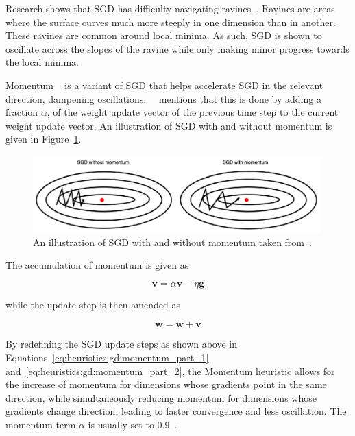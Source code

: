 Research shows that \acs{SGD} has difficulty navigating ravines~\cite{ref:sutton:1986}. Ravines are areas where the surface curves much more steeply in one dimension than in another. These ravines are common around local minima. As such, \acs{SGD} is shown to oscillate across the slopes of the ravine while only making minor progress towards the local minima.

\Acs{Momentum} ~\cite{ref:qian:1999} is a variant of \acs{SGD} that helps accelerate \acs{SGD} in the relevant direction, dampening oscillations.~\citeauthor{ref:ruder:2016}~\cite{ref:ruder:2016} mentions that this is done by adding a fraction $\alpha$, of the weight update vector of the previous time step to the current weight update vector. An illustration of \acs{SGD} with and without momentum is given in Figure~\ref{fig:heuristics:gd:sgd_with_and_without_momentum}.

\begin{figure}[htbp]
	\centering
	\includegraphics[width=0.99\textwidth]{images/sgd_with_and_without_momentum.pdf}
	\caption{An illustration of \acf{SGD} with and without momentum taken from~\cite{ref:du:2019}.}
	\label{fig:heuristics:gd:sgd_with_and_without_momentum}
\end{figure}

The accumulation of momentum is given as

\begin{equation}
	\boldsymbol{v} = \alpha \boldsymbol{v} - \eta \boldsymbol{g}
	\label{eq:heuristics:gd:momentum_part_1}
\end{equation}

while the update step is then amended as

\begin{equation}
	\boldsymbol{w} = \boldsymbol{w} + \boldsymbol{v}
	\label{eq:heuristics:gd:momentum_part_2}
\end{equation}

By redefining the \acs{SGD} update steps as shown above in Equations~\eqref{eq:heuristics:gd:momentum_part_1} and~\eqref{eq:heuristics:gd:momentum_part_2}, the \acs{Momentum} heuristic allows for the increase of momentum for dimensions whose gradients point in the same direction, while simultaneously reducing momentum for dimensions whose gradients change direction, leading to faster convergence and less oscillation. The momentum term $\alpha$ is usually set to 0.9~\cite{ref:engelbrecht:2007, ref:ruder:2016}.

